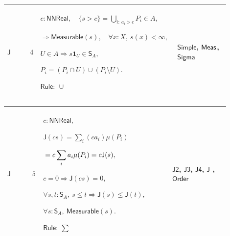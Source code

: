 \documentclass[12pt,reqno]{amsart}
\theoremstyle{blueplain}
\numberwithin{equation}{section}
\begin{document}
{\scriptsize \setlength{\parskip}{0pt}\nointerlineskip
\noindent 
\begin{tabular}{|@{}>{\centering\arraybackslash}m{0.10658\linewidth}|>{\centering\arraybackslash}m{0.03553\linewidth}|>{\centering\arraybackslash}m{0.52105\linewidth}|>{\centering\arraybackslash}m{0.23684\linewidth}|}
\hline
\hypertarget{proof:J4}{$\displaystyle \mathsf{J}$} & $\displaystyle 4$ & $%
\displaystyle c:\mathsf{NNReal},\quad\{s>c\}=\bigcup_{i:\ a_i>c}P_i\in A,$%
\par$\displaystyle \Rightarrow\mathsf{Measurable}(s),\quad\forall x:X,\
s(x)<\infty,$\par$\displaystyle U\in A\Rightarrow s\mathbf{1}_U\in\mathsf{S}%
_A,$\par$\displaystyle P_i=(P_i\cap U)\mathbin{\dot\cup}(P_i\setminus U).$%
\par$\displaystyle \mathsf{Rule}:\ \cup$ & \hyperlink{def:Simple}{$%
\displaystyle \mathsf{Simple}$}, \hyperlink{def:Meas}{$\displaystyle \mathsf{%
Meas}$}, \hyperlink{ax:Sigma}{$\displaystyle \mathsf{Sigma}$} \\ \hline
\end{tabular}%
}

{\scriptsize \setlength{\parskip}{0pt}\nointerlineskip
\noindent 
\begin{tabular}{|@{}>{\centering\arraybackslash}m{0.10658\linewidth}|>{\centering\arraybackslash}m{0.03553\linewidth}|>{\centering\arraybackslash}m{0.52105\linewidth}|>{\centering\arraybackslash}m{0.23684\linewidth}|}
\hline
\hypertarget{proof:J5}{$\displaystyle \mathsf{J}$} & $\displaystyle 5$ & $%
\displaystyle c:\mathsf{NNReal},$\par$\displaystyle \mathsf{J}%
(cs)=\sum_i(ca_i)\mu(P_i)$\par$\displaystyle {}=c\sum_i a_i\mu(P_i)=c\mathsf{%
J}(s),$\par$\displaystyle c=0\Rightarrow\mathsf{J}(cs)=0,$\par$\displaystyle %
\forall s,t:\mathsf{S}_A,\ s\le t\Rightarrow\mathsf{J}(s)\le\mathsf{J}(t),$%
\par$\displaystyle \forall s:\mathsf{S}_A,\ \mathsf{Measurable}(s).$\par$%
\displaystyle \mathsf{Rule}:\ \sum$ & \hyperlink{proof:J2}{$\displaystyle 
\mathsf{J2}$}, \hyperlink{proof:J3}{$\displaystyle \mathsf{J3}$}, \hyperlink{proof:J4}%
{$\displaystyle \mathsf{J4}$}, \hyperlink{def:J}{$\displaystyle \mathsf{J}$}%
, \hyperlink{ax:Order}{$\displaystyle \mathsf{Order}$} \\ \hline
\end{tabular}%
}
\end{document}
